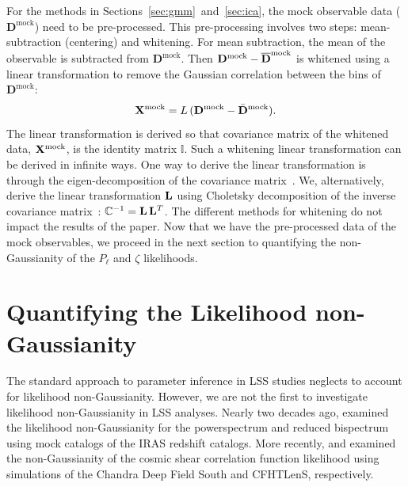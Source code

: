 \documentclass[12pt, letterpaper, preprint]{aastex}
\newcommand{\beq}{\begin{equation}}
\newcommand{\eeq}{\end{equation}}
\newcommand{\Dmock}{\mathbf{D}^\mathrm{mock}}
\newcommand{\Xmock}{{\bf X}^\mathrm{mock}}
\begin{document}
For the methods in Sections~\ref{sec:gmm}~and~\ref{sec:ica}, the mock 
observable data ($\Dmock$) need to be pre-processed. This pre-processing
involves two steps: mean-subtraction (centering) and whitening. For mean subtraction, 
the mean of the observable is subtracted from $\Dmock$. Then 
$\Dmock - \overline{\bf D}^\mathrm{mock}$ is whitened using a linear transformation 
to remove the Gaussian correlation between the bins of $\Dmock$: 
\beq
\Xmock = L\,(\Dmock - \bar{\bf D}^\mathrm{mock}). 
\eeq
The linear transformation is derived so that covariance matrix of the whitened 
data, $\Xmock$, is the identity matrix $\mathbb{I}$. Such a whitening linear 
transformation can be derived in infinite ways. 
One way to derive the linear transformation is through the eigen-decomposition
of the covariance matrix~\citep[\emph{e.g.}][]{hartlap2009, sellentin2017}. We, alternatively, 
derive the linear transformation ${\bf L}$ using Choletsky decomposition of the 
inverse covariance matrix~\citep{Press:1992:NRC:148286}: 
$\mathbb{C}^{-1} = {\bf L}\,{\bf L}^T$. The different methods for whitening 
do not impact the results of the paper. Now that we have the pre-processed 
data of the mock observables, we proceed in the next section to quantifying 
the non-Gaussianity of the $P_\ell$ and $\zeta$ likelihoods. 


\section{Quantifying the Likelihood non-Gaussianity} \label{sec:div}
The standard approach to parameter inference in LSS studies neglects
to account for likelihood non-Gaussianity. 
However, we are not the first to investigate likelihood non-Gaussianity 
in LSS analyses. Nearly two decades ago, \cite{scoccimarro2000} examined 
the likelihood non-Gaussianity for the powerspectrum and reduced bispectrum 
using mock catalogs of the IRAS redshift catalogs. More recently, 
\cite{hartlap2009} and \cite{sellentin2017} examined the non-Gaussianity 
of the cosmic shear correlation function likelihood using simulations of 
the Chandra Deep Field South and CFHTLenS, respectively. 
\end{document}
